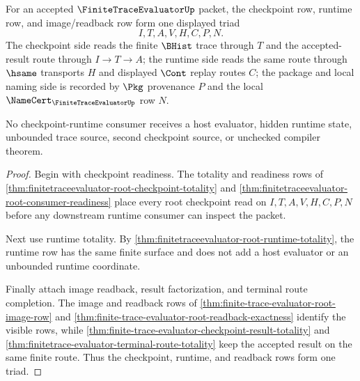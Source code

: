 \begin{theorem}
\label{thm:finite-trace-evaluator-checkpoint-runtime-triad}
For an accepted $\FiniteTraceEvaluatorUp$ packet, the checkpoint row, runtime
row, and image/readback row form one displayed triad
$$
I,T,A,V,H,C,P,N.
$$
The checkpoint side reads the finite $\BHist$ trace through $T$ and the
accepted-result route through $I \to T \to A$; the runtime side reads the same
route through $\hsame$ transports $H$ and displayed $\Cont$ replay routes $C$;
the package and local naming side is recorded by $\Pkg$ provenance $P$ and the
local $\NameCert_{\FiniteTraceEvaluatorUp}$ row $N$.

No checkpoint-runtime consumer receives a host evaluator, hidden runtime
state, unbounded trace source, second checkpoint source, or unchecked compiler
theorem.
\end{theorem}
\begin{proof}
Begin with checkpoint readiness. The totality and readiness rows of
\autoref{thm:finitetraceevaluator-root-checkpoint-totality} and
\autoref{thm:finitetraceevaluator-root-consumer-readiness} place every root
checkpoint read on $I,T,A,V,H,C,P,N$ before any downstream runtime consumer can
inspect the packet.

Next use runtime totality. By
\autoref{thm:finitetraceevaluator-root-runtime-totality}, the runtime row has
the same finite surface and does not add a host evaluator or an unbounded
runtime coordinate.

Finally attach image readback, result factorization, and terminal route
completion. The image and readback rows of
\autoref{thm:finite-trace-evaluator-root-image-row} and
\autoref{thm:finite-trace-evaluator-root-readback-exactness} identify the
visible rows, while
\autoref{thm:finite-trace-evaluator-checkpoint-result-totality} and
\autoref{thm:finitetrace-evaluator-terminal-route-totality} keep the accepted
result on the same finite route. Thus the checkpoint, runtime, and readback
rows form one triad.
\end{proof}

